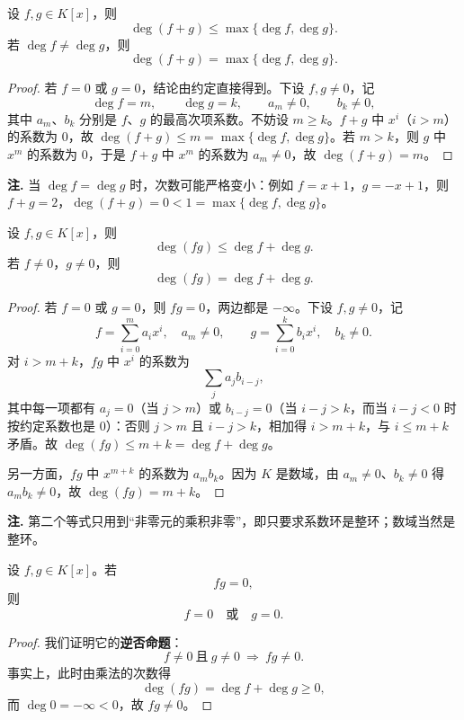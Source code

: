 \begin{proposition}[加法的次数]
设 \(f,g\in K[x]\)，则
\[
\deg(f+g)\le\max\{\deg f,\deg g\}.
\]
若 \(\deg f\ne\deg g\)，则
\[
\deg(f+g)=\max\{\deg f,\deg g\}.
\]
\end{proposition}

\begin{proof}
若 \(f=0\) 或 \(g=0\)，结论由约定直接得到。下设 \(f,g\ne0\)，记
\[
\deg f=m,\qquad \deg g=k,\qquad a_m\ne0,\qquad b_k\ne0,
\]
其中 \(a_m\)、\(b_k\) 分别是 \(f\)、\(g\) 的最高次项系数。不妨设 \(m\ge k\)。\(f+g\) 中 \(x^i\)（\(i>m\)）的系数为 \(0\)，故 \(\deg(f+g)\le m=\max\{\deg f,\deg g\}\)。若 \(m>k\)，则 \(g\) 中 \(x^m\) 的系数为 \(0\)，于是 \(f+g\) 中 \(x^m\) 的系数为 \(a_m\ne0\)，故 \(\deg(f+g)=m\)。
\end{proof}

\noindent\textbf{注.} 当 \(\deg f=\deg g\) 时，次数可能严格变小：例如 \(f=x+1\)，\(g=-x+1\)，则 \(f+g=2\)，\(\deg(f+g)=0<1=\max\{\deg f,\deg g\}\)。

\begin{proposition}[乘法的次数]
设 \(f,g\in K[x]\)，则
\[
\deg(fg)\le\deg f+\deg g .
\]
若 \(f\ne0\)，\(g\ne0\)，则
\[
\deg(fg)=\deg f+\deg g .
\]
\end{proposition}

\begin{proof}
若 \(f=0\) 或 \(g=0\)，则 \(fg=0\)，两边都是 \(-\infty\)。下设 \(f,g\ne0\)，记
\[
f=\sum_{i=0}^{m}a_ix^i,\quad a_m\ne0,\qquad g=\sum_{i=0}^{k}b_ix^i,\quad b_k\ne0 .
\]
对 \(i>m+k\)，\(fg\) 中 \(x^i\) 的系数为
\[
\sum_{j}a_jb_{i-j},
\]
其中每一项都有 \(a_j=0\)（当 \(j>m\)）或 \(b_{i-j}=0\)（当 \(i-j>k\)，而当 \(i-j<0\) 时按约定系数也是 \(0\)）：否则 \(j>m\) 且 \(i-j>k\)，相加得 \(i>m+k\)，与 \(i\le m+k\) 矛盾。故 \(\deg(fg)\le m+k=\deg f+\deg g\)。

另一方面，\(fg\) 中 \(x^{m+k}\) 的系数为 \(a_mb_k\)。因为 \(K\) 是数域，由 \(a_m\ne0\)、\(b_k\ne0\) 得 \(a_mb_k\ne0\)，故 \(\deg(fg)=m+k\)。
\end{proof}

\noindent\textbf{注.} 第二个等式只用到“非零元的乘积非零”，即只要求系数环是整环；数域当然是整环。

\begin{corollary}[多项式环无零因子]
设 \(f,g\in K[x]\)。若
\[
fg=0,
\]
则
\[
f=0\quad\text{或}\quad g=0 .
\]
\end{corollary}

\begin{proof}
我们证明它的\textbf{逆否命题}：
\[
f\ne0\ \text{且}\ g\ne0\ \Longrightarrow\ fg\ne0 .
\]
事实上，此时由乘法的次数得
\[
\deg(fg)=\deg f+\deg g\ge0,
\]
而 \(\deg0=-\infty<0\)，故 \(fg\ne0\)。
\end{proof}

